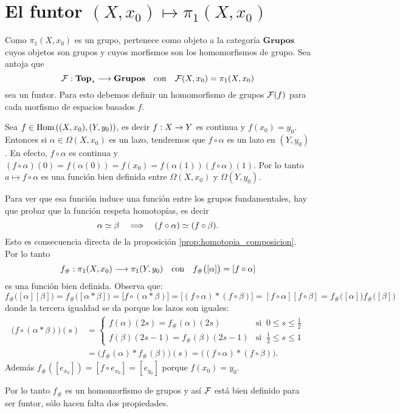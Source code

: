 \documentclass[../../topologia_algebraica]{subfiles}
\begin{document}
\section{El funtor $(X,x_0) \mapsto \pi_1(X,x_0)$}

Como $\pi_1(X,x_0)$ es un grupo, pertenece como objeto a la categor\'ia $\mathbf{Grupos}$ cuyos
objetos son grupos y cuyos morfismos son los homomorfismos de grupo. Sea antoja que
\[
  \mathcal{F}:\mathbf{Top}_* \longrightarrow \mathbf{Grupos} \quad\text{con}\quad \mathcal{F}(X,x_0)=\pi_1(X,x_0)
\]
sea un funtor. Para esto debemos definir un homomorfismo de grupos $\mathcal{F}(f)$ para cada morfismo
de espacios basados $f$.

Sea $f\in\text{Hom}\left( (X,x_0),(Y,y_0) \right)$, es decir $f:X\rightarrow Y$ es continua y $f(x_0)=y_0$. Entonces si
$\alpha\in\Omega(X,x_0)$ es un lazo, tendremos que $f\circ\alpha$ es un lazo en $(Y,y_0)$. En
efecto, $f\circ\alpha$ es continua y
$(f\circ\alpha)(0)=f(\alpha(0))=f(x_0)=f(\alpha(1))(f\circ\alpha)(1)$. Por lo tanto
$a\mapsto f\circ\alpha$ es una funci\'on bien definida entre $\Omega(X,x_0)$ y $\Omega(Y,y_0)$.

Para ver que esa funci\'on induce una funci\'on entre los grupos fundamentales, hay que
probar que la funci\'on respeta homotop\'ias, es decir
\[
  \alpha\simeq\beta \quad\Longrightarrow\quad (f\circ\alpha)\simeq(f\circ\beta).
\]
Esto es consecuencia directa de la proposici\'on \ref{prop:homotopia_composicion}. Por lo tanto
\[
  f_{\#}:\pi_1(X,x_0) \longrightarrow \pi_1(Y,y_0) \quad\text{con}\quad f_{\#}\big([\alpha]\big)=[f\circ\alpha]
\]
es una funci\'on bien definida. Observa que:
\[
  f_{\#}\big([\alpha][\beta]\big)=f_{\#}\big( [\alpha*\beta] \big)=\big[ f\circ(\alpha*\beta) \big]=
  \big[(f\circ\alpha)*(f\circ\beta)\big]=[f\circ\alpha][f\circ\beta]=
  f_{\#}\big([\alpha]\big)f_{\#}\big([\beta]\big)
\]
donde la tercera igualdad se da porque los lazos son iguales:
\begin{align*}
  \big(f\circ(\alpha*\beta) \big)(s) & =
  \begin{cases}
    f(\alpha)(2s)=f_{\#}(\alpha)(2s) & \text{si}\;\; 0\leq s\leq \frac{1}{2}\\
    f(\beta)(2s-1)=f_{\#}(\beta)(2s-1) & \text{si}\;\; \frac{1}{2}\leq s\leq 1
  \end{cases} \\ & =
  \Big(f_{\#}(\alpha)*f_{\#}(\beta)\Big)(s)=\Big((f\circ\alpha)*(f\circ\beta)\Big).
\end{align*}
Adem\'as $f_{\#}([e_{x_0}])=[f\circ e_{x_0}]=[e_{y_0}]$ porque $f(x_0)=y_0$.

Por lo tanto $f_{\#}$ es un homomorfismo de grupos y as\'i $\mathcal{F}$ est\'a bien definido
para ser funtor, s\'olo hacen falta dos propiedades.
\end{document}

